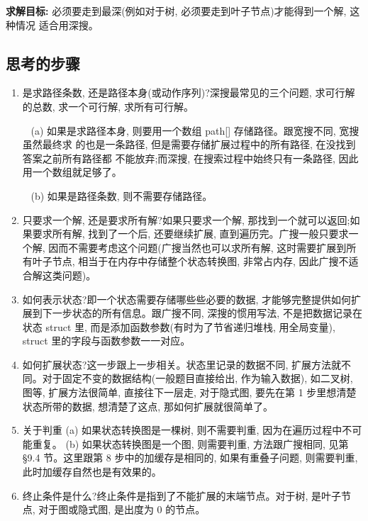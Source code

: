 \documentclass[12pt]{book}
\begin{document}
 \textbf{求解目标:} 必须要走到最深(例如对于树, 必须要走到叶子节点)才能得到一个解, 这种情况
适合用深搜。

\subsection{思考的步骤}
\label{sec-11-4-2}
\begin{enumerate}
\item 是求路径条数, 还是路径本身(或动作序列)?深搜最常见的三个问题, 求可行解的总数, 求一个可行解, 求所有可行解。
\label{sec-11-4-2-1}

~ (a) 如果是求路径本身, 则要用一个数组 path[] 存储路径。跟宽搜不同, 宽搜虽然最终求
的也是一条路径, 但是需要存储扩展过程中的所有路径, 在没找到答案之前所有路径都
不能放弃;而深搜, 在搜索过程中始终只有一条路径, 因此用一个数组就足够了。

~ (b) 如果是路径条数, 则不需要存储路径。
\item 只要求一个解, 还是要求所有解?如果只要求一个解, 那找到一个就可以返回;如果要求所有解, 找到了一个后, 还要继续扩展, 直到遍历完。广搜一般只要求一个解, 因而不需要考虑这个问题(广搜当然也可以求所有解, 这时需要扩展到所有叶子节点, 相当于在内存中存储整个状态转换图, 非常占内存, 因此广搜不适合解这类问题)。
\label{sec-11-4-2-2}

\item 如何表示状态?即一个状态需要存储哪些些必要的数据, 才能够完整提供如何扩展到下一步状态的所有信息。跟广搜不同, 深搜的惯用写法, 不是把数据记录在状态 struct 里, 而是添加函数参数(有时为了节省递归堆栈, 用全局变量), struct 里的字段与函数参数一一对应。
\label{sec-11-4-2-3}

\item 如何扩展状态?这一步跟上一步相关。状态里记录的数据不同, 扩展方法就不同。对于固定不变的数据结构(一般题目直接给出, 作为输入数据), 如二叉树, 图等, 扩展方法很简单, 直接往下一层走, 对于隐式图, 要先在第 1 步里想清楚状态所带的数据, 想清楚了这点, 那如何扩展就很简单了。
\label{sec-11-4-2-4}

\item 关于判重
\label{sec-11-4-2-5}
(a) 如果状态转换图是一棵树, 则不需要判重, 因为在遍历过程中不可能重复。
(b) 如果状态转换图是一个图, 则需要判重, 方法跟广搜相同, 见第 §9.4 节。这里跟第 8 步中的加缓存是相同的, 如果有重叠子问题, 则需要判重, 此时加缓存自然也是有效果的。

\item 终止条件是什么?终止条件是指到了不能扩展的末端节点。对于树, 是叶子节点, 对于图或隐式图, 是出度为 0 的节点。
\label{sec-11-4-2-6}


\end{enumerate}
\end{document}
